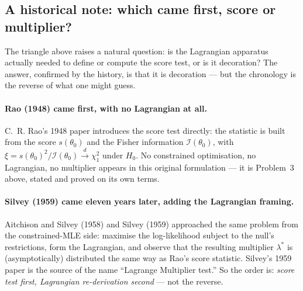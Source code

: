 \documentclass[a4paper,oneside,12pt]{extarticle}
\theoremstyle{plain}
\theoremstyle{definition}
\theoremstyle{remark}
\begin{document}
\subsection{A historical note: which came first, score or
multiplier?}
\label{subsec:envelope_lm_history}

The triangle above raises a natural question: is the Lagrangian
apparatus actually needed to define or compute the score test, or
is it decoration? The answer, confirmed by the history, is that it
is decoration --- but the chronology is the reverse of what one
might guess.

\paragraph{Rao (1948) came first, with no Lagrangian at all.}
C.~R. Rao's 1948 paper introduces the score test directly: the
statistic is built from the score $s(\theta_0)$ and the Fisher
information $\mathcal{I}(\theta_0)$, with $\xi=s(\theta_0)^2/
\mathcal{I}(\theta_0)\xrightarrow{d}\chi^2_1$ under $H_0$. No
constrained optimisation, no Lagrangian, no multiplier appears in
this original formulation --- it is Problem~3 above, stated and
proved on its own terms.

\paragraph{Silvey (1959) came eleven years later, adding the
Lagrangian framing.}
Aitchison and Silvey (1958) and Silvey (1959) approached the same
problem from the constrained-MLE side: maximise the log-likelihood
subject to the null's restrictions, form the Lagrangian, and observe
that the resulting multiplier $\lambda^*$ is (asymptotically)
distributed the same way as Rao's score statistic. Silvey's 1959
paper is the source of the name ``Lagrange Multiplier test.'' So
the order is: \emph{score test first, Lagrangian re-derivation
second} --- not the reverse.
\end{document}
